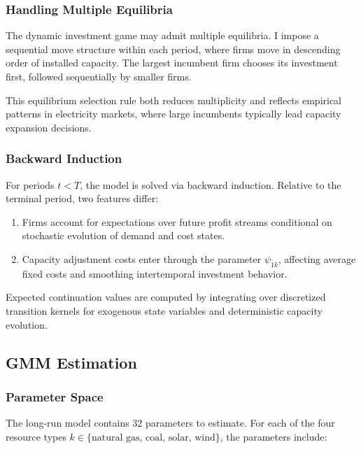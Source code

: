 \documentclass[12pt]{article}
\begin{document}
\subsubsection{Handling Multiple Equilibria}\label{subsec:multiple_equilibria}

The dynamic investment game may admit multiple equilibria. I impose a sequential move structure within each period, where firms move in descending order of installed capacity. The largest incumbent firm chooses its investment first, followed sequentially by smaller firms.

This equilibrium selection rule both reduces multiplicity and reflects empirical patterns in electricity markets, where large incumbents typically lead capacity expansion decisions.

\subsubsection{Backward Induction}\label{subsec:backward_induction}
For periods $t < T$, the model is solved via backward induction. Relative to the terminal period, two features differ:

\begin{enumerate}
\item Firms account for expectations over future profit streams conditional on stochastic evolution of demand and cost states.
\item Capacity adjustment costs enter through the parameter $\psi_{1k}$, affecting average fixed costs and smoothing intertemporal investment behavior.
\end{enumerate}

Expected continuation values are computed by integrating over discretized transition kernels for exogenous state variables and deterministic capacity evolution.

\subsection{GMM Estimation}\label{sec:gmm}

\subsubsection{Parameter Space}\label{subsec:parameters}

The long-run model contains 32 parameters to estimate. For each of the four resource types $k \in \{\text{natural gas, coal, solar, wind}\}$, the parameters include:
\end{document}
